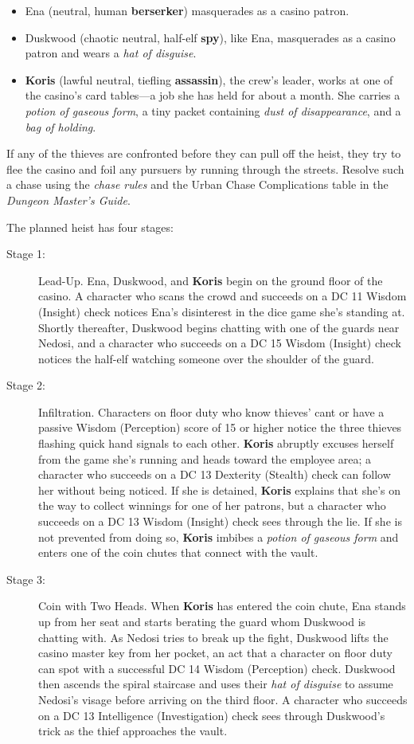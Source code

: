 \documentclass[10pt,a4paper,twoside,fancy,bg=print,twocolumn,openany,nodeprecatedcode]{dndbook}
\begin{document}
\begin{itemize}
\item Ena (neutral, human \textbf{berserker}) masquerades as a casino patron.
\item Duskwood (chaotic neutral, half-elf \textbf{spy}), like Ena, masquerades as a casino patron and wears a \textit{hat of disguise}.
\item \textbf{Koris} (lawful neutral, tiefling \textbf{assassin}), the crew's leader, works at one of the casino's card tables—a job she has held for about a month. She carries a \textit{potion of gaseous form}, a tiny packet containing \textit{dust of disappearance}, and a \textit{bag of holding}.
\end{itemize}

If any of the thieves are confronted before they can pull off the heist, they try to flee the casino and foil any pursuers by running through the streets. Resolve such a chase using the \textit{chase rules} and the Urban Chase Complications table in the \textit{Dungeon Master's Guide}.

The planned heist has four stages:


\begin{description}
\item[Stage 1:]
Lead-Up. Ena, Duskwood, and \textbf{Koris} begin on the ground floor of the casino. A character who scans the crowd and succeeds on a DC 11 Wisdom (Insight) check notices Ena's disinterest in the dice game she's standing at. Shortly thereafter, Duskwood begins chatting with one of the guards near Nedosi, and a character who succeeds on a DC 15 Wisdom (Insight) check notices the half-elf watching someone over the shoulder of the guard.
\item[Stage 2:]
Infiltration. Characters on floor duty who know thieves' cant or have a passive Wisdom (Perception) score of 15 or higher notice the three thieves flashing quick hand signals to each other. \textbf{Koris} abruptly excuses herself from the game she's running and heads toward the employee area; a character who succeeds on a DC 13 Dexterity (Stealth) check can follow her without being noticed. If she is detained, \textbf{Koris} explains that she's on the way to collect winnings for one of her patrons, but a character who succeeds on a DC 13 Wisdom (Insight) check sees through the lie. If she is not prevented from doing so, \textbf{Koris} imbibes a \textit{potion of gaseous form} and enters one of the coin chutes that connect with the vault.
\item[Stage 3:]
Coin with Two Heads. When \textbf{Koris} has entered the coin chute, Ena stands up from her seat and starts berating the guard whom Duskwood is chatting with. As Nedosi tries to break up the fight, Duskwood lifts the casino master key from her pocket, an act that a character on floor duty can spot with a successful DC 14 Wisdom (Perception) check. Duskwood then ascends the spiral staircase and uses their \textit{hat of disguise} to assume Nedosi's visage before arriving on the third floor. A character who succeeds on a DC 13 Intelligence (Investigation) check sees through Duskwood's trick as the thief approaches the vault.
\end{description}
\end{document}
